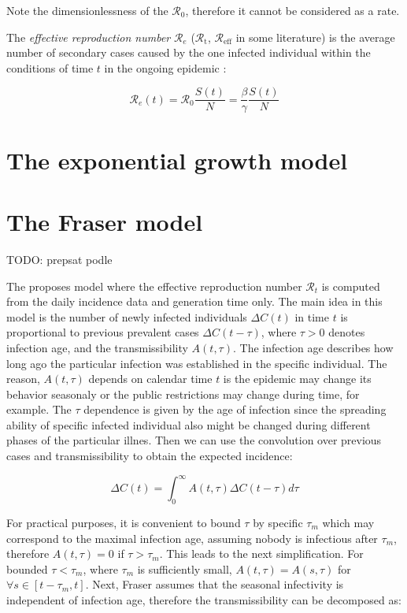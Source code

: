 \documentclass[
  digital, %
  table,   %
  twoside, %
  12pt,
  lof,     %
  lot,     %
]{fithesis3}
\begin{document}
Note the dimensionlessness of the $\mathcal{R}_0$, therefore 
it cannot be considered as a rate.

The \textit{effective reproduction number} $\mathcal{R}_e$ 
($\mathcal{R}_{\text{t}}$, $\mathcal{R}_{\text{eff}}$ in 
some literature) is the average number of secondary cases 
caused by the one infected individual within the 
conditions of time $t$ in the ongoing epidemic \cite{chowell2016}:

\begin{equation}
	\mathcal{R}_e(t) = \mathcal{R}_0 \frac{S(t)}{N} = \frac{\beta}{\gamma} \frac{S(t)}{N}
\end{equation}

\section{The exponential growth model}



\section{The Fraser model}

TODO: prepsat podle \cite{ma2019}

The \cite{fraser2007} proposes model where the effective 
reproduction number $\mathcal{R}_t$ is computed from the 
daily incidence data and generation time only.
The main idea in this model is the number of newly infected 
individuals $\Delta C(t)$ in time $t$ is proportional to 
previous prevalent cases $\Delta C(t - \tau)$, where 
$\tau > 0$ denotes infection age, and the transmissibility 
$A(t, \tau)$. The infection age describes how long ago 
the particular infection was established in the specific 
individual.
The reason, $A(t, \tau)$ depends on calendar time $t$ is 
the epidemic may change its behavior seasonaly or the 
public restrictions may change during time, for example.
The $\tau$ dependence is given by the age of infection 
since the spreading ability of specific infected individual 
also might be changed during different phases of the 
particular illnes.
Then we can use the convolution over previous cases 
and transmissibility to obtain the expected incidence:

\begin{equation}
\Delta C( t ) = \int^{\infty}_0 A ( t, \tau ) \Delta C ( t - \tau ) d\tau
\end{equation}

For practical purposes, it is convenient to bound $\tau$ 
by specific $\tau_m$ which may correspond to the maximal 
infection age, assuming nobody is infectious after 
$\tau_m$, therefore $A(t, \tau) = 0$ if $\tau > \tau_m$.
This leads to the next simplification.
For bounded $\tau < \tau_m$, where $\tau_m$ is 
sufficiently small, $A(t, \tau) = A(s, \tau)$ for 
$\forall s \in \left[ t - \tau_m, t \right]$.
Next, Fraser assumes that the seasonal infectivity is 
independent of infection age, therefore the transmissibility 
can be decomposed as:
\end{document}
